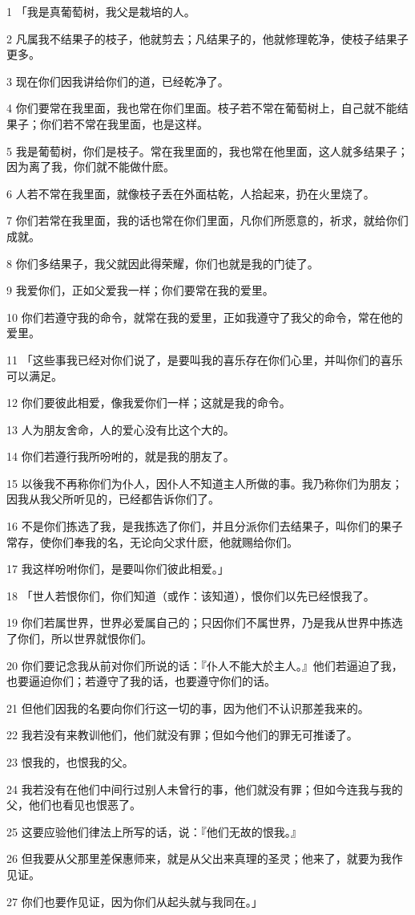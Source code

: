 \par 1 「我是真葡萄树，我父是栽培的人。
\par 2 凡属我不结果子的枝子，他就剪去；凡结果子的，他就修理乾净，使枝子结果子更多。
\par 3 现在你们因我讲给你们的道，已经乾净了。
\par 4 你们要常在我里面，我也常在你们里面。枝子若不常在葡萄树上，自己就不能结果子；你们若不常在我里面，也是这样。
\par 5 我是葡萄树，你们是枝子。常在我里面的，我也常在他里面，这人就多结果子；因为离了我，你们就不能做什麽。
\par 6 人若不常在我里面，就像枝子丢在外面枯乾，人拾起来，扔在火里烧了。
\par 7 你们若常在我里面，我的话也常在你们里面，凡你们所愿意的，祈求，就给你们成就。
\par 8 你们多结果子，我父就因此得荣耀，你们也就是我的门徒了。
\par 9 我爱你们，正如父爱我一样；你们要常在我的爱里。
\par 10 你们若遵守我的命令，就常在我的爱里，正如我遵守了我父的命令，常在他的爱里。
\par 11 「这些事我已经对你们说了，是要叫我的喜乐存在你们心里，并叫你们的喜乐可以满足。
\par 12 你们要彼此相爱，像我爱你们一样；这就是我的命令。
\par 13 人为朋友舍命，人的爱心没有比这个大的。
\par 14 你们若遵行我所吩咐的，就是我的朋友了。
\par 15 以後我不再称你们为仆人，因仆人不知道主人所做的事。我乃称你们为朋友；因我从我父所听见的，已经都告诉你们了。
\par 16 不是你们拣选了我，是我拣选了你们，并且分派你们去结果子，叫你们的果子常存，使你们奉我的名，无论向父求什麽，他就赐给你们。
\par 17 我这样吩咐你们，是要叫你们彼此相爱。」
\par 18 「世人若恨你们，你们知道（或作：该知道），恨你们以先已经恨我了。
\par 19 你们若属世界，世界必爱属自己的；只因你们不属世界，乃是我从世界中拣选了你们，所以世界就恨你们。
\par 20 你们要记念我从前对你们所说的话：『仆人不能大於主人。』他们若逼迫了我，也要逼迫你们；若遵守了我的话，也要遵守你们的话。
\par 21 但他们因我的名要向你们行这一切的事，因为他们不认识那差我来的。
\par 22 我若没有来教训他们，他们就没有罪；但如今他们的罪无可推诿了。
\par 23 恨我的，也恨我的父。
\par 24 我若没有在他们中间行过别人未曾行的事，他们就没有罪；但如今连我与我的父，他们也看见也恨恶了。
\par 25 这要应验他们律法上所写的话，说：『他们无故的恨我。』
\par 26 但我要从父那里差保惠师来，就是从父出来真理的圣灵；他来了，就要为我作见证。
\par 27 你们也要作见证，因为你们从起头就与我同在。」

